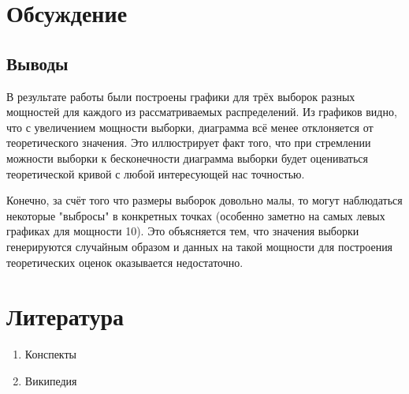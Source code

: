\documentclass[12pt]{article}
\begin{document}
\section{Обсуждение}

\subsection{Выводы}
В результате работы были построены графики для трёх выборок разных мощностей для каждого из рассматриваемых распределений. Из графиков видно, что с увеличением мощности выборки, диаграмма всё менее отклоняется от теоретического значения. Это иллюстрирует факт того, что при стремлении можности выборки к бесконечности диаграмма выборки будет оцениваться теоретической кривой с любой интересующей нас точностью.
\par
Конечно, за счёт того что размеры выборок довольно малы, то могут наблюдаться некоторые "выбросы" в конкретных точках (особенно заметно на самых левых графиках для мощности 10). Это объясняется тем, что значения выборки генерируются случайным образом и данных на такой мощности для построения теоретических оценок оказывается недостаточно.


\section{Литература}
\begin{enumerate}
\item Конспекты
\item Википедия
\end{enumerate}
\end{document}
